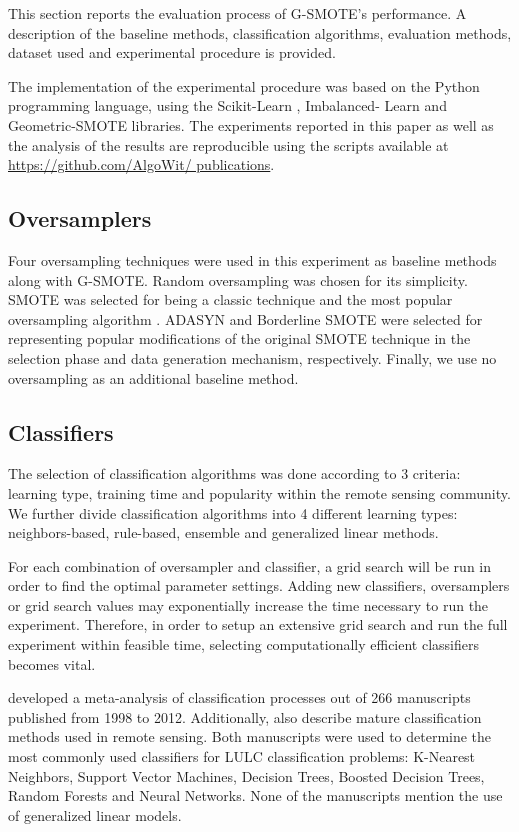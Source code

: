 \documentclass[remotesensing,article,submit,moreauthors,pdftex]{Definitions/mdpi}
\begin{document}
This section reports the evaluation process of G-SMOTE's performance. A
description of the baseline methods, classification algorithms, evaluation
methods, dataset used and experimental procedure is provided.

The implementation of the experimental procedure was based on the Python
programming language, using the Scikit-Learn \cite{Pedregosa2011}, Imbalanced-
Learn \cite{JMLR:v18:16-365} and Geometric-SMOTE \cite{Douzas2019} libraries.
The experiments reported in this paper as well as the analysis of the results
are reproducible using the scripts available at \url{https://github.com/AlgoWit/
publications}.

\subsection{Oversamplers}

Four oversampling techniques were used in this experiment as baseline methods
along with G-SMOTE. Random oversampling was chosen for its simplicity. SMOTE was
selected for being a classic technique and the most popular oversampling
algorithm \cite{Douzas2019}. ADASYN \cite{HaiboHe2008} and Borderline SMOTE
\cite{Han2005} were selected for representing popular modifications of the
original SMOTE technique in the selection phase and data generation mechanism,
respectively. Finally, we use no oversampling as an additional baseline method.

\subsection{Classifiers}

The selection of classification algorithms was done according to 3 criteria:
learning type, training time and popularity within the remote sensing community.
We further divide classification algorithms into 4 different learning types:
neighbors-based, rule-based, ensemble and generalized linear methods.

For each combination of oversampler and classifier, a grid search will be run in
order to find the optimal parameter settings. Adding new classifiers,
oversamplers or grid search values may exponentially increase the time necessary
to run the experiment. Therefore, in order to setup an extensive grid search and
run the full experiment within feasible time, selecting computationally
efficient classifiers becomes vital.

\cite{Khatami2016} developed a meta-analysis of classification processes out of
266 manuscripts published from 1998 to 2012. Additionally, \cite{Maxwell2018}
also describe mature classification methods used in remote sensing. Both
manuscripts were used to determine the most commonly used classifiers for LULC
classification problems: K-Nearest Neighbors, Support Vector Machines, Decision
Trees, Boosted Decision Trees, Random Forests and Neural Networks. None of the
manuscripts mention the use of generalized linear models.
\end{document}
